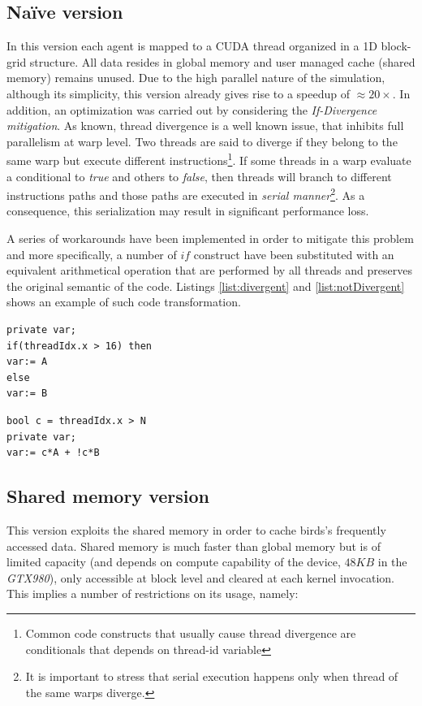 \subsection{Na\"{i}ve version}
In this version each agent is mapped to a CUDA thread organized in a 1D block-grid structure.
All data resides in global memory and user managed cache (shared memory) remains unused. 
Due to the high parallel nature of the simulation, although its simplicity, this version already gives rise to a speedup of $\approx20 \times$. In addition, an optimization was carried out by considering the \emph{If-Divergence mitigation}. As known, thread divergence is a well known
issue, that inhibits full parallelism at warp level. Two threads are said to
diverge if they belong to the same warp but execute different
instructions\footnote{Common code constructs that usually cause thread
	divergence are conditionals that depends on  thread-id variable}. If some
threads in a warp evaluate a conditional to \emph{true} and others to \emph{false}, then threads will branch to different instructions paths
and those paths are executed in \emph{serial manner}\footnote{It is important to
	stress that serial execution happens only when thread of the same warps 
	diverge.}\cite{NvidiaprogGuide}. As a consequence, this serialization may result in significant performance loss.

A series of workarounds have been implemented in order to mitigate this problem and more specifically, a number of $if$ construct have been substituted with an equivalent arithmetical operation that are performed by all threads and preserves the original semantic of the code. Listings \ref{list:divergent} and \ref{list:notDivergent} shows an example of such code transformation.

\begin{lstlisting}
private var;
if(threadIdx.x > 16) then
var:= A
else
var:= B
\end{lstlisting}

\begin{lstlisting}[label={list:notDivergent}, caption=If mitigated version of the listing \ref{list:divergent} ]
bool c = threadIdx.x > N
private var;
var:= c*A + !c*B
\end{lstlisting}


\subsection{Shared memory version}
This version exploits the shared memory in order to cache birds's frequently accessed data. Shared memory is much faster than global memory but is of limited capacity (and depends on compute capability of the device, $48 KB$ in the \emph{GTX980})\cite{CUDA2}, only accessible at block level and cleared at each kernel invocation. This implies a number of restrictions on its usage, namely:

